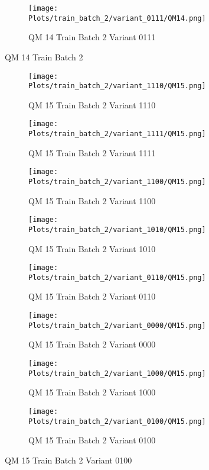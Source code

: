 \documentclass{DissertateFigs}
\begin{document}
\begin{figure}[t!]
\medskip

    \begin{subfigure}{0.47\textwidth}
    \texttt{[image: Plots/train\_batch\_2/variant\_0111/QM14.png]}
    \caption{QM 14 Train Batch 2 Variant 0111}
    \end{subfigure}
\caption{QM 14 Train Batch 2}
    \end{figure}
\clearpage
\begin{figure}[t!]
    \begin{subfigure}{0.32\textwidth}
    \texttt{[image: Plots/train\_batch\_2/variant\_1110/QM15.png]}
    \caption{QM 15 Train Batch 2 Variant 1110}
    \end{subfigure}
    \begin{subfigure}{0.32\textwidth}
    \texttt{[image: Plots/train\_batch\_2/variant\_1111/QM15.png]}
    \caption{QM 15 Train Batch 2 Variant 1111}
    \end{subfigure}

\medskip

    \begin{subfigure}{0.32\textwidth}
    \texttt{[image: Plots/train\_batch\_2/variant\_1100/QM15.png]}
    \caption{QM 15 Train Batch 2 Variant 1100}
    \end{subfigure}
    \begin{subfigure}{0.32\textwidth}
    \texttt{[image: Plots/train\_batch\_2/variant\_1010/QM15.png]}
    \caption{QM 15 Train Batch 2 Variant 1010}
    \end{subfigure}

\medskip

    \begin{subfigure}{0.32\textwidth}
    \texttt{[image: Plots/train\_batch\_2/variant\_0110/QM15.png]}
    \caption{QM 15 Train Batch 2 Variant 0110}
    \end{subfigure}
    \begin{subfigure}{0.32\textwidth}
    \texttt{[image: Plots/train\_batch\_2/variant\_0000/QM15.png]}
    \caption{QM 15 Train Batch 2 Variant 0000}
    \end{subfigure}

\medskip

    \begin{subfigure}{0.32\textwidth}
    \texttt{[image: Plots/train\_batch\_2/variant\_1000/QM15.png]}
    \caption{QM 15 Train Batch 2 Variant 1000}
    \end{subfigure}
    \begin{subfigure}{0.32\textwidth}
    \texttt{[image: Plots/train\_batch\_2/variant\_0100/QM15.png]}
    \caption{QM 15 Train Batch 2 Variant 0100}
    \end{subfigure}


\end{figure}
\end{document}
